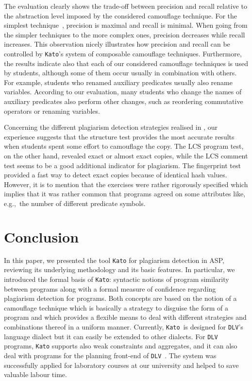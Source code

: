\documentclass{tlp}
\newcommand{\dlv}{\texttt{DLV}\xspace}
\newcommand{\egc}[0]{e.g.,\ }
\newcommand{\kato}[0]{\texttt{Kato}\xspace}
\begin{document}
The evaluation clearly shows the trade-off between precision and recall relative to the abstraction level imposed by the considered
camouflage technique. 
For the simplest technique~, precision is maximal and recall is minimal.
When going from the simpler techniques to
the more complex ones, precision decreases while recall increases.
This observation nicely illustrates how precision and recall can be controlled by \kato's system of composable camouflage techniques.
Furthermore, the results indicate also that each of our considered camouflage techniques is used by students, although some of them occur usually in combination with others. 
For example, students who renamed auxiliary predicates 
usually also rename variables. 
According to our evaluation, many students who change the names of auxiliary predicates also perform other changes, such as reordering commutative operators or renaming variables. 

Concerning  the different plagiarism detection strategies realised in ,
our experience suggests that the structure test provides the most accurate results when  
students spent some effort to camouflage the copy. 
The LCS program test, on the other hand, revealed  exact or almost exact copies, while the LCS comment test seems to be a good additional indicator for plagiarism. 
The fingerprint test  provided a fast way to 
 detect exact copies because of  identical hash values.
However, it is to mention that the exercises were rather rigorously specified which implies that it was rather common
that programs agreed on some attributes like, \egc the number of different predicate symbols.

\section{Conclusion }\label{sec:concl}


 In this paper, 
 we presented the tool \kato for plagiarism detection  in ASP, reviewing its underlying  methodology and its
 basic features.
 In particular, we introduced the formal basis of \kato:   syntactic notions of program similarity between programs 
 along with a formal measure of confidence regarding
 plagiarism detection for programs. Both concepts are based on the notion of a camouflage technique which is
 basically a strategy to  disguise
 the form of a program and which provides
 a flexible means to deal with different strategies and combinations thereof in a uniform manner.
 Currently, \kato\ is designed for \dlv's language dialect but it can easily be  extended
 to other dialects.
 For \dlv programs, \kato supports also weak constraints and aggregates, and it can also deal with programs for the  planning front-end of  \dlv~\cite{eiter03}. 
The system was successfully applied for laboratory courses 
at our university and helped to save valuable labour time.  
\end{document}
